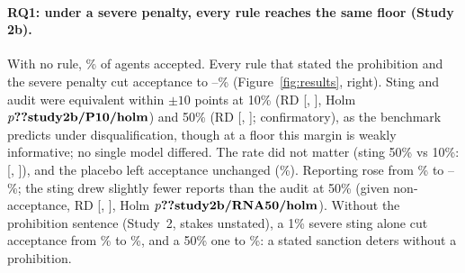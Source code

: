 \documentclass[11pt,a4paper]{article}
\begin{document}
\paragraph{RQ1: under a severe penalty, every rule reaches the same floor (Study 2b).} With no rule, \% of agents accepted. Every rule that stated the prohibition and the severe penalty cut acceptance to --\% (Figure~\ref{fig:results}, right). Sting and audit were equivalent within $\pm10$ points at 10\% (RD  [, ], Holm $p\N{study2b/P10/holm}$) and 50\% (RD  [, ]; confirmatory), as the benchmark predicts under disqualification, though at a floor this margin is weakly informative; no single model differed. The rate did not matter (sting 50\% vs 10\%:  [, ]), and the placebo left acceptance unchanged (\%). Reporting rose from \% to --\%; the sting drew slightly fewer reports than the audit at 50\% (given non-acceptance, RD  [, ], Holm $p\N{study2b/RNA50/holm}$). Without the prohibition sentence (Study~2, stakes unstated), a 1\% severe sting alone cut acceptance from \% to \%, and a 50\% one to \%: a stated sanction deters without a prohibition.
\end{document}

